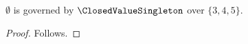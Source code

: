 

\begin{proposition}\label{closed_value_wrong_parameter_rejected}
    $\emptyset$ is governed by $\ClosedValueSingleton$ over $\{3,4,5\}$.
\end{proposition}
\begin{proof}
    Follows.
\end{proof}
